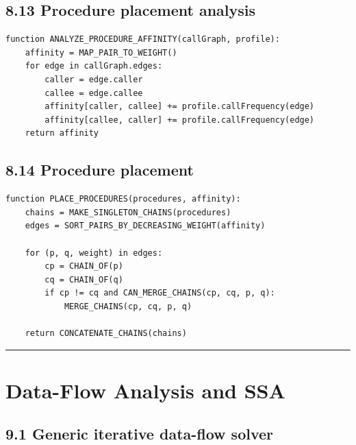 \documentclass[10pt,letterpaper]{article}
\begin{document}
\subsection*{8.13 Procedure placement analysis}
{}

\begin{verbatim}
function ANALYZE_PROCEDURE_AFFINITY(callGraph, profile):
    affinity = MAP_PAIR_TO_WEIGHT()
    for edge in callGraph.edges:
        caller = edge.caller
        callee = edge.callee
        affinity[caller, callee] += profile.callFrequency(edge)
        affinity[callee, caller] += profile.callFrequency(edge)
    return affinity
\end{verbatim}

\subsection*{8.14 Procedure placement}
{}

\begin{verbatim}
function PLACE_PROCEDURES(procedures, affinity):
    chains = MAKE_SINGLETON_CHAINS(procedures)
    edges = SORT_PAIRS_BY_DECREASING_WEIGHT(affinity)

    for (p, q, weight) in edges:
        cp = CHAIN_OF(p)
        cq = CHAIN_OF(q)
        if cp != cq and CAN_MERGE_CHAINS(cp, cq, p, q):
            MERGE_CHAINS(cp, cq, p, q)

    return CONCATENATE_CHAINS(chains)
\end{verbatim}

\medskip\hrule\medskip

\clearpage
\section{Data-Flow Analysis and SSA}

\subsection*{9.1 Generic iterative data-flow solver}
{}
\end{document}
